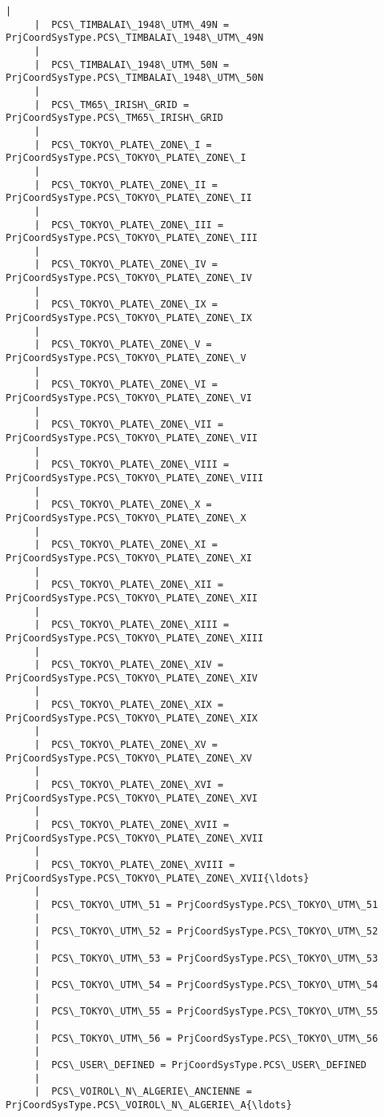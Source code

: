 \documentclass[11pt]{article}
\begin{document}
\begin{Verbatim}[commandchars=\\\{\}]
     |  
     |  PCS\_TIMBALAI\_1948\_UTM\_49N = PrjCoordSysType.PCS\_TIMBALAI\_1948\_UTM\_49N
     |  
     |  PCS\_TIMBALAI\_1948\_UTM\_50N = PrjCoordSysType.PCS\_TIMBALAI\_1948\_UTM\_50N
     |  
     |  PCS\_TM65\_IRISH\_GRID = PrjCoordSysType.PCS\_TM65\_IRISH\_GRID
     |  
     |  PCS\_TOKYO\_PLATE\_ZONE\_I = PrjCoordSysType.PCS\_TOKYO\_PLATE\_ZONE\_I
     |  
     |  PCS\_TOKYO\_PLATE\_ZONE\_II = PrjCoordSysType.PCS\_TOKYO\_PLATE\_ZONE\_II
     |  
     |  PCS\_TOKYO\_PLATE\_ZONE\_III = PrjCoordSysType.PCS\_TOKYO\_PLATE\_ZONE\_III
     |  
     |  PCS\_TOKYO\_PLATE\_ZONE\_IV = PrjCoordSysType.PCS\_TOKYO\_PLATE\_ZONE\_IV
     |  
     |  PCS\_TOKYO\_PLATE\_ZONE\_IX = PrjCoordSysType.PCS\_TOKYO\_PLATE\_ZONE\_IX
     |  
     |  PCS\_TOKYO\_PLATE\_ZONE\_V = PrjCoordSysType.PCS\_TOKYO\_PLATE\_ZONE\_V
     |  
     |  PCS\_TOKYO\_PLATE\_ZONE\_VI = PrjCoordSysType.PCS\_TOKYO\_PLATE\_ZONE\_VI
     |  
     |  PCS\_TOKYO\_PLATE\_ZONE\_VII = PrjCoordSysType.PCS\_TOKYO\_PLATE\_ZONE\_VII
     |  
     |  PCS\_TOKYO\_PLATE\_ZONE\_VIII = PrjCoordSysType.PCS\_TOKYO\_PLATE\_ZONE\_VIII
     |  
     |  PCS\_TOKYO\_PLATE\_ZONE\_X = PrjCoordSysType.PCS\_TOKYO\_PLATE\_ZONE\_X
     |  
     |  PCS\_TOKYO\_PLATE\_ZONE\_XI = PrjCoordSysType.PCS\_TOKYO\_PLATE\_ZONE\_XI
     |  
     |  PCS\_TOKYO\_PLATE\_ZONE\_XII = PrjCoordSysType.PCS\_TOKYO\_PLATE\_ZONE\_XII
     |  
     |  PCS\_TOKYO\_PLATE\_ZONE\_XIII = PrjCoordSysType.PCS\_TOKYO\_PLATE\_ZONE\_XIII
     |  
     |  PCS\_TOKYO\_PLATE\_ZONE\_XIV = PrjCoordSysType.PCS\_TOKYO\_PLATE\_ZONE\_XIV
     |  
     |  PCS\_TOKYO\_PLATE\_ZONE\_XIX = PrjCoordSysType.PCS\_TOKYO\_PLATE\_ZONE\_XIX
     |  
     |  PCS\_TOKYO\_PLATE\_ZONE\_XV = PrjCoordSysType.PCS\_TOKYO\_PLATE\_ZONE\_XV
     |  
     |  PCS\_TOKYO\_PLATE\_ZONE\_XVI = PrjCoordSysType.PCS\_TOKYO\_PLATE\_ZONE\_XVI
     |  
     |  PCS\_TOKYO\_PLATE\_ZONE\_XVII = PrjCoordSysType.PCS\_TOKYO\_PLATE\_ZONE\_XVII
     |  
     |  PCS\_TOKYO\_PLATE\_ZONE\_XVIII = PrjCoordSysType.PCS\_TOKYO\_PLATE\_ZONE\_XVII{\ldots}
     |  
     |  PCS\_TOKYO\_UTM\_51 = PrjCoordSysType.PCS\_TOKYO\_UTM\_51
     |  
     |  PCS\_TOKYO\_UTM\_52 = PrjCoordSysType.PCS\_TOKYO\_UTM\_52
     |  
     |  PCS\_TOKYO\_UTM\_53 = PrjCoordSysType.PCS\_TOKYO\_UTM\_53
     |  
     |  PCS\_TOKYO\_UTM\_54 = PrjCoordSysType.PCS\_TOKYO\_UTM\_54
     |  
     |  PCS\_TOKYO\_UTM\_55 = PrjCoordSysType.PCS\_TOKYO\_UTM\_55
     |  
     |  PCS\_TOKYO\_UTM\_56 = PrjCoordSysType.PCS\_TOKYO\_UTM\_56
     |  
     |  PCS\_USER\_DEFINED = PrjCoordSysType.PCS\_USER\_DEFINED
     |  
     |  PCS\_VOIROL\_N\_ALGERIE\_ANCIENNE = PrjCoordSysType.PCS\_VOIROL\_N\_ALGERIE\_A{\ldots}

\end{Verbatim}
\end{document}

